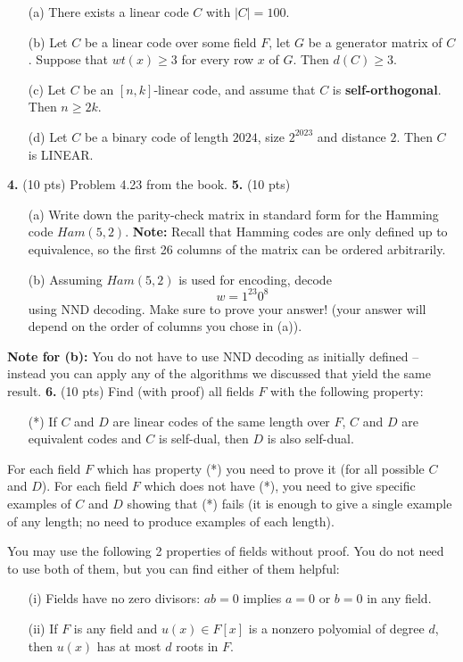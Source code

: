 \documentclass[12pt]{amsart}
\begin{document}
\begin{itemize}
\item[(a)] There exists a linear code $C$ with $|C|=100$. 
\item[(b)] Let $C$ be a linear code over some field $F$, let $G$ be a generator matrix of $C$.
Suppose that $wt(x)\geq 3$ for every row $x$ of $G$. Then $d(C)\geq 3$.
\item[(c)] Let $C$ be an $[n,k]$-linear code, and assume that $C$ is {\bf self-orthogonal}. Then $n\geq 2k$.
\item[(d)] Let $C$ be a binary code of length $2024$, size $2^{2023}$ and distance $2$. Then $C$ is LINEAR.
\end{itemize}
\skv
{\bf 4. }\rm (10 pts) Problem 4.23 from the book.
\skv
{\bf 5. }\rm (10 pts) 
\begin{itemize}
\item[(a)] Write down the parity-check matrix in standard form for the Hamming code $Ham(5,2)$. {\bf Note:} Recall that Hamming codes are only defined up to equivalence, so the first 26 columns
of the matrix can be ordered arbitrarily.
\item[(b)] Assuming $Ham(5,2)$ is used for encoding, decode $$w=1^{23}0^8$$ using NND decoding. Make sure to prove your answer! (your answer will depend on the order of columns you chose in (a)).
\end{itemize}
{\bf Note for (b):} You do not have to use NND decoding as initially defined -- instead you can apply any of the algorithms we discussed that yield the same result. 
\skv
{\bf 6. }\rm (10 pts) Find (with proof) all fields $F$ with the following property:
\begin{itemize}
\item[(*)] If $C$ and $D$ are linear codes of the same length over $F$, $C$ and $D$ are equivalent codes and $C$ is self-dual, then $D$ is also self-dual.
\end{itemize}
For each field $F$ which has property (*) you need to prove it (for all possible $C$
and $D$). For each field $F$ which does not have (*),
you need to give specific examples of $C$ and $D$ showing that (*) fails (it is enough to
give a single example of any length; no need to produce examples of each length).

You may use the following 2 properties of fields without proof. You do not need to use both of them, but you can find either of them helpful:

\begin{itemize}
\item[(i)] Fields have no zero divisors: $ab=0$ implies $a=0$ or $b=0$ in any field.
\item[(ii)] If $F$ is any field and $u(x)\in F[x]$ is a nonzero polyomial of degree $d$,
then $u(x)$ has at most $d$ roots in $F$.
\end{itemize}
\end{document}
